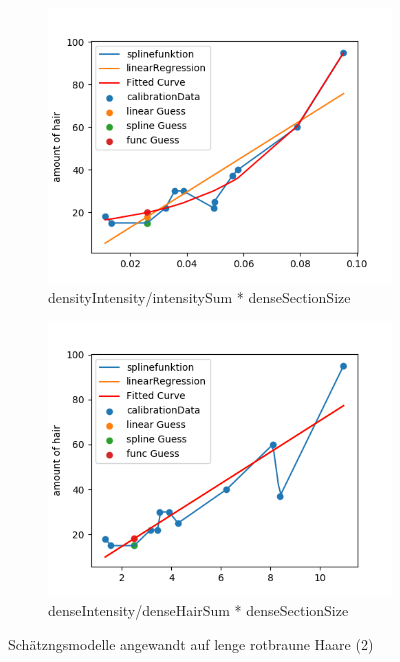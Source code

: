 \documentclass[german,a4paper, 12pt]{scrartcl}
\begin{document}
\begin{figure}[H]
	\medskip
	\begin{subfigure}{0.48\textwidth}
		\includegraphics[width=1.15\linewidth]{fig64/g11_denseIntensitynorm.png}
		\caption{densityIntensity/intensitySum * denseSectionSize} \label{fig:e}
	\end{subfigure}\hspace*{\fill}
	\begin{subfigure}{0.48\textwidth}
		\includegraphics[width=1.15\linewidth]{fig64/g12_denseIntensitynorm2.png}
		\caption{denseIntensity/denseHairSum * denseSectionSize} \label{fig:f}
	\end{subfigure}
	
	
	\caption{Schätzngsmodelle angewandt auf lenge rotbraune Haare (2)} \label{fig:1}
\end{figure}
\end{document}

